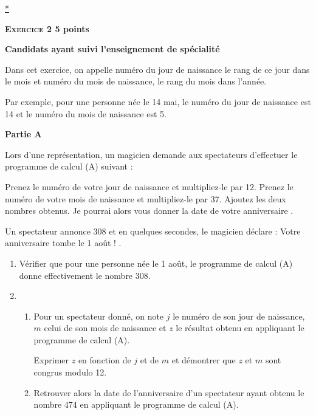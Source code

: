 \documentclass[10pt]{article}
\begin{document}
\hyperlink{Index}{*}
\vspace{0,5cm}

\textbf{\textsc{Exercice 2} \hfill 5 points}
 
\textbf{Candidats ayant suivi l'enseignement de spécialité }

\medskip{}

Dans cet exercice, on appelle numéro du jour de naissance le rang de ce jour dans le mois et numéro du mois de naissance, le rang du mois dans l'année.
 
Par exemple, pour une personne née le 14 mai, le numéro du jour de naissance est 14 et le numéro du mois de naissance est 5.

\bigskip
 
\textbf{Partie A}

\medskip
 
Lors d'une représentation, un magicien demande aux spectateurs d'effectuer le programme de calcul (A) suivant :
 
\og Prenez le numéro de votre jour de naissance et multipliez-le par 12. Prenez le numéro de votre mois de naissance et multipliez-le par 37. Ajoutez les deux nombres obtenus. Je pourrai alors vous donner la date de votre anniversaire \fg.
 
Un spectateur annonce $308$ et en quelques secondes, le magicien déclare : \og Votre anniversaire tombe le 1 août ! \fg.

\medskip
 
\begin{enumerate}
\item Vérifier que pour une personne née le 1 août, le programme de calcul (A) donne effectivement le nombre $308$. 
\item  
	\begin{enumerate}
		\item Pour un spectateur donné, on note $j$ le numéro de son jour de naissance, $m$ celui de son mois de naissance et $z$ le résultat obtenu en appliquant le programme de calcul (A). 

Exprimer $z$ en fonction de $j$ et de $m$ et démontrer que $z$ et $m$ sont congrus modulo 12. 
		\item Retrouver alors la date de l'anniversaire d'un spectateur ayant obtenu le nombre $474$ en appliquant le programme de calcul (A).
	\end{enumerate} 
\end{enumerate}

\bigskip
\end{document}
